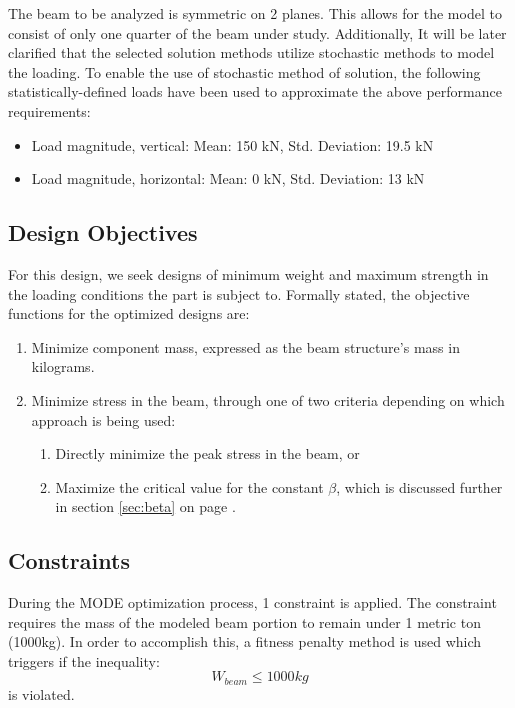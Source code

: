 The beam to be analyzed is symmetric on 2 planes. This allows for the model to consist of only one quarter of the beam under study. Additionally, It will be later clarified that the selected solution methods utilize stochastic methods to model the loading. To enable the use of stochastic method of solution, the following statistically-defined loads have been used to approximate the above performance requirements: 

\begin{itemize}
\item Load magnitude, vertical:   Mean: 150 kN, Std. Deviation: 19.5 kN
\item Load magnitude, horizontal: Mean: 0   kN, Std. Deviation: 13 kN
\end{itemize}

\subsection{Design Objectives}
For this design, we seek designs of minimum weight and maximum strength in the loading conditions the part is subject to. Formally stated, the objective functions for the optimized designs are: 

\begin{enumerate}
\item Minimize component mass, expressed as the beam structure's mass in kilograms. 
\item Minimize stress in the beam, through one of two criteria depending on which approach is being used: 
	\begin{enumerate}
	    \item Directly minimize the peak stress in the beam, or
	    \item Maximize the critical value for the constant $\beta$, which is discussed further in section \ref{sec:beta} on page \pageref{sec:beta}.
	\end{enumerate}
\end{enumerate}

\subsection{Constraints}
During the MODE optimization process, 1 constraint is applied. The constraint requires the mass of the modeled beam portion to remain under 1 metric ton (1000kg). In order to accomplish this, a fitness penalty method is used which triggers if the inequality:
$$
W_{beam} \leq 1000kg
$$
is violated. 

